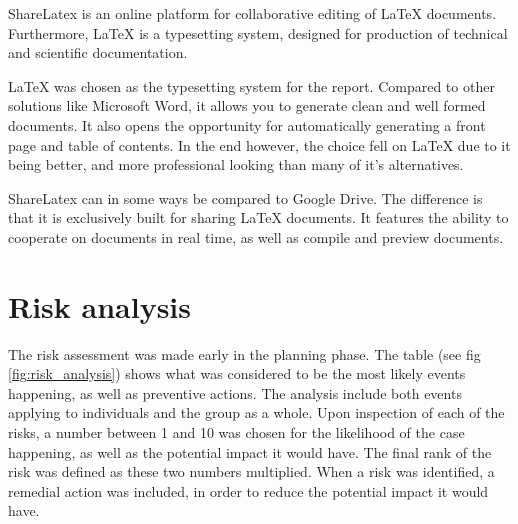 ShareLatex \cite{sharelatex} is an online platform for collaborative editing of LaTeX documents. Furthermore, LaTeX is a typesetting system, designed for production of technical and scientific documentation.

LaTeX was chosen as the typesetting system for the report. Compared to other solutions like Microsoft Word, it allows you to generate clean and well formed documents. It also opens the opportunity for automatically generating a front page and table of contents. In the end however, the choice fell on LaTeX due to it being better, and more professional looking than many of it's alternatives.

ShareLatex can in some ways be compared to Google Drive. The difference is that it is exclusively built for sharing LaTeX documents. It features the ability to cooperate on documents in real time, as well as compile and preview documents.

\section{Risk analysis}
\label{sec:prestudies-risk_analysis}

The risk assessment was made early in the planning phase. The table (see fig  \ref{fig:risk_analysis}) shows what was considered to be the most likely events happening, as well as preventive actions. The analysis include both events applying to individuals and the group as a whole. Upon inspection of each of the risks, a number between 1 and 10 was chosen for the likelihood of the case happening, as well as the potential impact it would have. The final rank of the risk was defined as these two numbers multiplied. When a risk was identified, a remedial action was included, in order to reduce the potential impact it would have.

